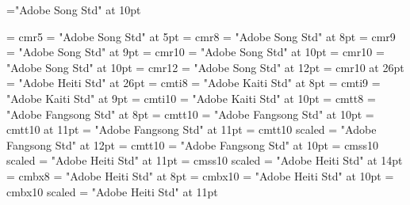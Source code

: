 %
\font\zhfont="Adobe Song Std" at 10pt
\def\zhpunctfont{\zhfont}

\zhspacing
\font\enfiverm = cmr5
\font\zhfiverm = "Adobe Song Std" at 5pt
\def\fiverm{\enfiverm\let\zhfont\zhfiverm}
\font\eneightrm = cmr8
\font\zheightrm = "Adobe Song Std" at 8pt
\def\eightrm{\eneightrm\let\zhfont\zheightrm}
\font\enninerm = cmr9 %
\font\zhninerm = "Adobe Song Std" at 9pt
\def\ninerm{\enninerm\let\zhfont\zhninerm}
\font\entenrm = cmr10 %
\font\zhtenrm = "Adobe Song Std"  at 10pt
\def\tenrm{\entenrm\let\zhfont\zhtenrm}
\font\enoldtenrm = cmr10 %
\font\zholdtenrm = "Adobe Song Std"  at 10pt
\def\oldtenrm{\enoldtenrm\let\zhfont\zholdtenrm}
\font\entwelverm = cmr12
\font\zhtwelverm = "Adobe Song Std"  at 12pt
\def\twelverm{\entwelverm\let\zhfont\zhtwelverm}
\font\entwentysixrm = cmr10 at 26pt
\font\zhtwentysixrm = "Adobe Heiti Std"  at 26pt
\def\twentysixrm{\entwentysixrm\let\zhfont\zhtwentysixrm}
%
\font\eneightit = cmti8
\font\zheightit = "Adobe Kaiti Std" at 8pt
\def\eightit{\eneightit\let\zhfont\zheightit}
\font\ennineit = cmti9
\font\zheightit = "Adobe Kaiti Std" at 9pt
\def\nineit{\ennineit\let\zhfont\zhnineit}
\font\entenit = cmti10
\font\zhtenit = "Adobe Kaiti Std" at 10pt
\def\tenit{\entenit\let\zhfont\zhtenit}
%
\font\eneighttt = cmtt8
\font\zheighttt = "Adobe Fangsong Std" at 8pt
\def\eighttt{\eneighttt\let\zhfont\zheighttt}
\font\ententt = cmtt10 
\font\zhtentt = "Adobe Fangsong Std" at 10pt
\def\tentt{\ententt\let\zhfont\zhtentt}
\font\eneleventt = cmtt10 at 11pt
\font\zheleventt = "Adobe Fangsong Std" at 11pt
\def\elventt{\enelventt\let\zhfont\zhelventt}
\font\entwelvett = cmtt10 scaled 
\font\zhtwelvett = "Adobe Fangsong Std" at 12pt
\def\twelvett{\entwelvett\let\zhfont\zhtwelvett}
%
\font\entenbt = cmtt10
\font\zhtenbt = "Adobe Fangsong Std" at 10pt
\def\tenbt{\entenbt\let\zhfont\zhtenbt}
%
\font\enelevensf = cmss10 scaled\magstephalf
\font\zhelevensf = "Adobe Heiti Std" at 11pt
\def\elevensf{\enelevensf\let\zhfont\zhelevensf}
\font\enfourteensf = cmss10 scaled
\font\zhfourteensf = "Adobe Heiti Std" at 14pt
\def\fourteensf{\enfourteensf\let\zhfont\zhfourteensf}
%
\font\eneightbf = cmbx8
\font\zheightbf = "Adobe Heiti Std" at 8pt
\def\eightbf{\eneightbf\let\zhfont\zheightbf}
\font\entenbf = cmbx10
\font\zhtenbf = "Adobe Heiti Std" at 10pt
\def\tenbf{\entenbf\let\zhfont\zhtenbf}
\font\enelevenbf = cmbx10 scaled \magstephalf
\font\zhelevenbf = "Adobe Heiti Std" at 11pt
\def\elevenbf{\enelevenbf\let\zhfont\zhelevenbf}
